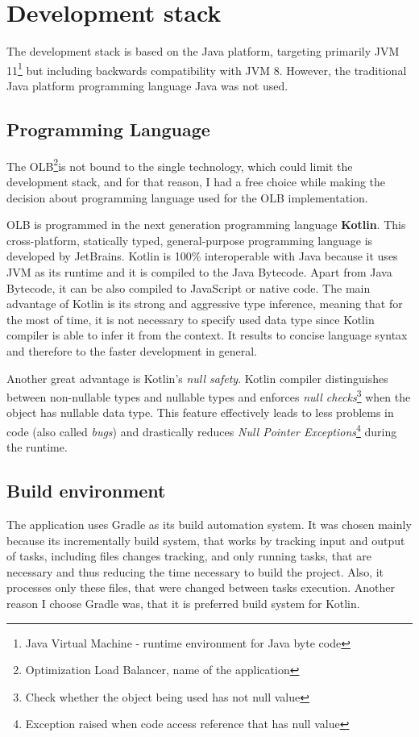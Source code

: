 \section{Development stack}\label{sec:development-stack}
The development stack is based on the Java platform, 
targeting primarily JVM 11\footnote{Java Virtual Machine - runtime environment for Java byte code}
but including backwards compatibility with JVM 8.
However, 
the traditional Java platform programming language Java was not used.

\subsection{Programming Language}\label{subsec:programming-language}
The OLB\footnote{Optimization Load Balancer, name of the application}is not bound to the single technology, 
which could limit the development stack, and for that reason,
I had a free choice while making the decision about programming language used for the OLB implementation.

OLB is programmed in the next generation programming language \textbf{Kotlin}.
This cross-platform, statically typed, general-purpose programming language is developed by JetBrains.
Kotlin is 100\% interoperable with Java because it uses JVM as its runtime and it is compiled to the Java Bytecode.
Apart from Java Bytecode, it can be also compiled to JavaScript or native code.
The main advantage of Kotlin is its strong and aggressive type inference,
meaning that for the most of time,
it is not necessary to specify used data type since Kotlin compiler is able to infer it from the context.
It results to concise language syntax and therefore to the faster development in general.

Another great advantage is Kotlin's \textit{null safety}. 
Kotlin compiler distinguishes between non-nullable types and nullable types 
and enforces \textit{null checks}\footnote{Check whether the object being used has not null value} when the object has nullable data type.
This feature effectively leads to less problems in code (also called \textit{bugs})
and drastically reduces \textit{Null Pointer Exceptions}\footnote{Exception raised when code access reference that has null value}
during the runtime.


\subsection{Build environment}
The application uses Gradle as its build automation system.
It was chosen mainly because its incrementally build system,
that works by tracking input and output of tasks, 
including files changes tracking, and only running tasks, that are necessary
and thus reducing the time necessary to build the project. 
Also, it processes only these files, that were changed between tasks execution. 
Another reason I choose Gradle was, that it is preferred build system for Kotlin.

